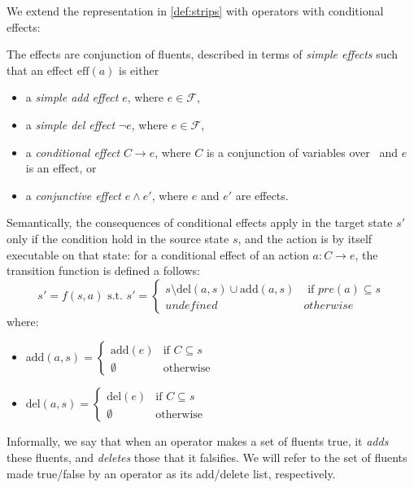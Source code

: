   We extend the representation in
  \autoref{def:strips} with operators with conditional effects:

\begin{definition}\label{def:adleffects}
  The effects are conjunction of fluents, described in terms of \emph{simple effects} such that
  an effect $\text{eff}(a)$ is either
  \begin{itemize}
  \item a \emph{simple add effect} $e$, where $e \in \mathcal{F}$,
  \item a \emph{simple del effect} $\neg e$, where $e \in
    \mathcal{F}$,
  \item a \emph{conditional effect} $C \rightarrow e$, where $C$ is a
    conjunction of variables over \fluents \ and $e$ is an effect, or
  \item a \emph{conjunctive effect} $e \land e'$, where $e$ and $e'$
    are effects.
  \end{itemize}
%
\end{definition}

Semantically, the consequences of conditional effects apply in the
target state $s'$
only if the condition hold in the source state $s$, and the action is by itself executable on that state:
for a conditional effect of an action $a: C \to e$, 
the transition function is defined a follows:\label{cond-eff}
\begin{equation*}
s' = f(s,a) \text{ s.t. } s' =  
                  \begin{cases}
                       s \setminus \text{del}(a,s) \cup \text{add}(a,s)&  \text{ if } pre(a) \subseteq s\\%
                       undefined & otherwise
                  \end{cases} 
\end{equation*}
  where: %
  \begin{itemize}
    \item add$(\mathit{a}, s) = \begin{cases}
                      \text{add}(e)& \text{if }  C \subseteq s\\
                    \emptyset& \text{otherwise}
                    \end{cases} $
    \item del$(\mathit{a, s}) = \begin{cases}
                      \text{del}(e)& \text{if } C \subseteq s\\
                    \emptyset& \text{otherwise}
                    \end{cases} $ 
   \end{itemize}
Informally, we say that
 when an operator makes a set of fluents true, it \emph{adds} these
 fluents, and \emph{deletes} those that it falsifies. We will
 refer to the set of fluents made true/false by an operator as its
 add/delete list, respectively.


